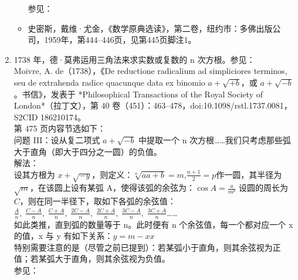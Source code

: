\begin{enumerate}
\begin{itemize}
参见：
\item 史密斯，戴维·尤金，《数学原典选读》，第二卷，纽约市：多佛出版公司，1959年，第444–446页，见第445页脚注1。
\end{itemize}
\item 1738 年，德·莫弗运用三角法来求实数或复数的 n 次方根。参见：\\
Moivre, A. de（1738），《De reductione radicalium ad simpliciores terminos, seu de extrahenda radice quacunque data ex binomio $a + \sqrt{+b}$，或 $a + \sqrt{-b}$。书信》，发表于 *Philosophical Transactions of the Royal Society of London*（拉丁文），第 40 卷（451）：463–478，doi:10.1098/rstl.1737.0081，S2CID 186210174。\\
第 475 页内容节选如下：\\
问题 III：设从复二项式 $a + \sqrt{-b}$ 中提取一个 n 次方根……我们只考虑那些弧大于直角（即大于四分之一圆）的负值。\\
解法：\\
设其方根为 $x + \sqrt{-y}$，则定义：$\sqrt[n]{aa + b} = m$,$\frac{n + 1}{2} = p$作一圆，其半径为 $\sqrt{m}$，在该圆上设有某弧 A，使得该弧的余弦为：$\cos A = \frac{a}{m^p}$
设圆的周长为 $C$，则在同一半径下，取如下各弧的余弦值：$\frac{A}{n},\; \frac{C - A}{n},\; \frac{C + A}{n},\; \frac{2C - A}{n},\; \frac{2C + A}{n},\; \frac{3C - A}{n},\; \frac{3C + A}{n}$……\\
如此类推，直到弧的数量等于 n。此时便有 n 个余弦值，每一个都对应一个 x 的值，x 与 y 有如下关系：$y = m - xx$\\
特别需要注意的是（尽管之前已提到）：若某弧小于直角，则其余弦视为正值；若某弧大于直角，则其余弦视为负值。\\
参见：

\end{enumerate}
